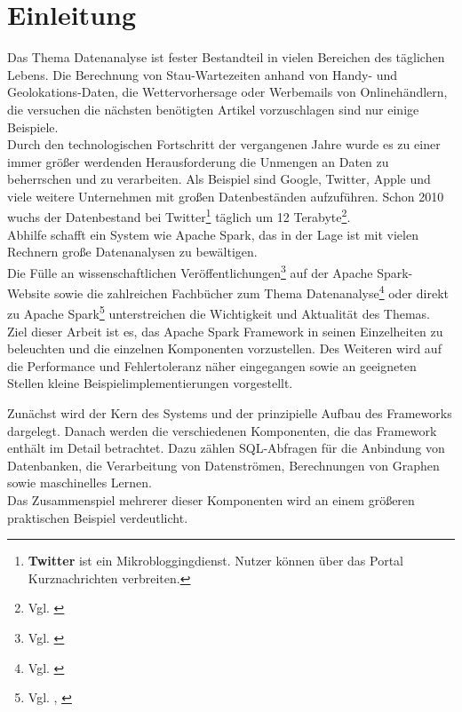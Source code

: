 \newpage
\chapter{Einleitung} 

Das Thema Datenanalyse ist fester Bestandteil in vielen Bereichen des täglichen Lebens. Die Berechnung von Stau-Wartezeiten anhand von Handy- und Geolokations-Daten, die Wettervorhersage oder Werbemails von Onlinehändlern, die versuchen die nächsten benötigten Artikel vorzuschlagen sind nur einige Beispiele.\\

\noindent
Durch den technologischen Fortschritt der vergangenen Jahre wurde es zu einer immer größer werdenden Herausforderung die Unmengen an Daten zu beherrschen und zu verarbeiten. Als Beispiel sind Google, Twitter, Apple und viele weitere Unternehmen mit großen Datenbeständen aufzuführen. Schon 2010 wuchs der Datenbestand bei Twitter\footnote{\textbf{Twitter} ist ein Mikrobloggingdienst. Nutzer können über das Portal Kurznachrichten verbreiten. } täglich um 12 Terabyte\footnote{Vgl. \cite{TWITTER_12}}. \\
Abhilfe schafft ein System wie Apache Spark, das in der Lage ist mit vielen Rechnern große Datenanalysen zu bewältigen. \\

\noindent
Die Fülle an wissenschaftlichen Veröffentlichungen\footnote{Vgl. \cite{SPRESEARCH}} auf der Apache Spark-Website sowie die zahlreichen Fachbücher zum Thema Datenanalyse\footnote{Vgl. \cite{DA15}} oder direkt zu Apache Spark\footnote{Vgl. \cite{AAWS15}, \cite{BDS16}} unterstreichen die Wichtigkeit und Aktualität des Themas.\\

\noindent
Ziel dieser Arbeit ist es, das Apache Spark Framework in seinen Einzelheiten zu beleuchten und die einzelnen Komponenten vorzustellen. Des Weiteren wird auf die Performance und Fehlertoleranz näher eingegangen sowie an geeigneten Stellen kleine Beispielimplementierungen vorgestellt.

\noindent
Zunächst wird der Kern des Systems und der prinzipielle Aufbau des Frameworks dargelegt. Danach werden die verschiedenen Komponenten, die das Framework enthält im Detail betrachtet. Dazu zählen SQL-Abfragen für die Anbindung von Datenbanken, die Verarbeitung von Datenströmen, Berechnungen von Graphen sowie maschinelles Lernen.\\
Das Zusammenspiel mehrerer dieser Komponenten wird an einem größeren praktischen Beispiel verdeutlicht. \\

